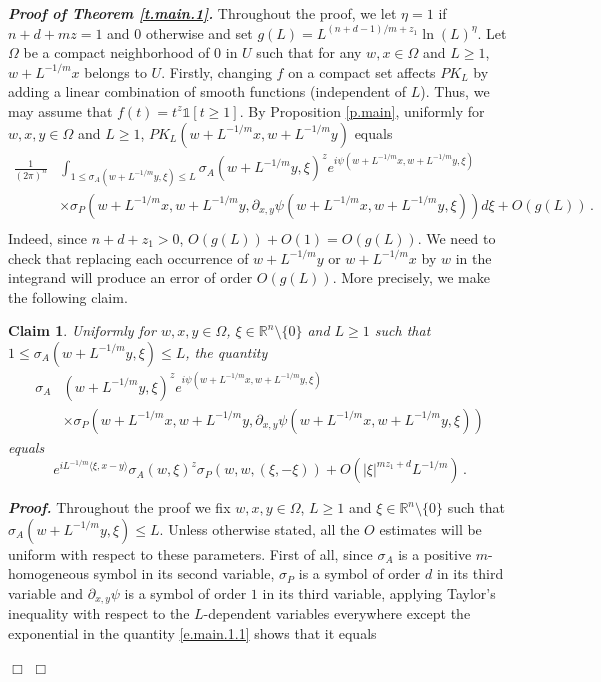 \documentclass[10pt,twoside]{article}
\newcommand{\R}{\mathbb{R}}
\newcommand{\one}{\mathds{1}}
\newenvironment{prf}[1][]
{\vskip 2mm  {\it \bf Proof#1. }}{$\Box$ \vskip 2mm}
\numberwithin{theorem}{section}
\newtheorem{claim}{Claim}
\begin{document}
\begin{prf}[ of Theorem \ref{t.main.1}]
Throughout the proof, we let $\eta=1$ if $n+d+mz=1$ and $0$ otherwise and set $g(L)=L^{(n+d-1)/m+z_1}\ln(L)^\eta$. Let $\Omega$ be a compact neighborhood of $0$ in $U$ such that for any $w,x\in \Omega$ and $L\geq 1$, $w+L^{-1/m}x$ belongs to $U$. Firstly, changing $f$ on a compact set affects $PK_L$ by adding a linear combination of smooth functions (independent of $L$). Thus, we may assume that $f(t)=t^z\one[t\geq 1]$. By Proposition \ref{p.main}, uniformly for $w,x,y\in \Omega$ and $L\geq 1$, $PK_L\left(w+L^{-1/m}x,w+L^{-1/m}y\right)$ equals
\begin{align}\label{e.main.1.6}
\frac{1}{(2\pi)^n}&\int_{1\leq \sigma_A(w+L^{-1/m}y,\xi)\leq L}\sigma_A(w+L^{-1/m}y,\xi)^ze^{i\psi(w+L^{-1/m}x,w+L^{-1/m}y,\xi)}\\\nonumber
&\times\sigma_P\left(w+L^{-1/m}x,w+L^{-1/m}y,\partial_{x,y}\psi\left(w+L^{-1/m}x,w+L^{-1/m}y,\xi\right)\right)d\xi+O(g(L))\, .\\\nonumber
\end{align}
Indeed, since $n+d+z_1>0$, $O(g(L))+O(1)=O(g(L))$. We need to check that replacing each occurrence of $w+L^{-1/m}y$ or $w+L^{-1/m}x$ by $w$ in the integrand will produce an error of order $O(g(L))$. More precisely, we make the following claim.
\begin{claim}\label{cl.main.2}
Uniformly for $w,x,y\in\Omega$, $\xi\in\R^n\setminus\{0\}$ and $L\geq 1$ such that $1\leq \sigma_A(w+L^{-1/m}y,\xi)\leq L$, the quantity
\begin{align}\label{e.main.1.1}
\sigma_A&(w+L^{-1/m}y,\xi)^ze^{i\psi(w+L^{-1/m}x,w+L^{-1/m}y,\xi)}\\\nonumber
&\times\sigma_P\left(w+L^{-1/m}x,w+L^{-1/m}y,\partial_{x,y}\psi\left(w+L^{-1/m}x,w+L^{-1/m}y,\xi\right)\right)
\end{align}
equals
\begin{equation}\label{e.main.1.2}
e^{iL^{-1/m}\langle\xi,x-y\rangle}\sigma_A(w,\xi)^z\sigma_P(w,w,(\xi,-\xi))+O\left(|\xi|^{mz_1+d}L^{-1/m}\right)\, .
\end{equation}
\end{claim}
\begin{prf}
Throughout the proof we fix $w,x,y\in\Omega$, $L\geq 1$ and $\xi\in\R^n\setminus\{0\}$ such that $\sigma_A(w+L^{-1/m}y,\xi)\leq L$. Unless otherwise stated, all the $O$ estimates will be uniform with respect to these parameters. First of all, since $\sigma_A$ is a positive $m$-homogeneous symbol in its second variable, $\sigma_P$ is a symbol of order $d$ in its third variable and $\partial_{x,y}\psi$ is a symbol of order $1$ in its third variable, applying Taylor's inequality with respect to the $L$-dependent variables everywhere except the exponential in the quantity \eqref{e.main.1.1} shows that it equals

\end{prf}
\end{prf}
\end{document}
